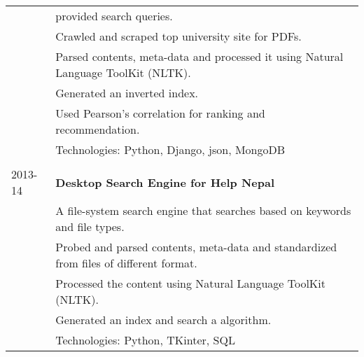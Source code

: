 \documentclass[letterpaper,10pt,oneside]{article}
\newcommand{\nextitem}{\par\hspace*{\labelsep}\textbullet\hspace*{\labelsep}}
\begin{document}
\begin{tabular}{l l}
         & provided search queries. \\
         & \footnotesize{\nextitem Crawled and scraped top university site for PDFs.} \\
         & \footnotesize{\nextitem Parsed contents, meta-data and processed it using Natural Language ToolKit (NLTK).} \\
         & \footnotesize{\nextitem Generated an inverted index.} \\
         & \footnotesize{\nextitem Used Pearson's correlation for ranking and recommendation.} \\
         & Technologies: Python, Django, json, MongoDB \\
         \\
 2013-14 & \textbf{Desktop Search Engine for Help Nepal} \\
         & A file-system search engine that searches based on keywords and file types. \\
         & \footnotesize{\nextitem Probed and parsed contents, meta-data and standardized from files of different format.} \\
         & \footnotesize{\nextitem Processed the content using Natural Language ToolKit (NLTK).} \\
         & \footnotesize{\nextitem Generated an index and search a algorithm.} \\
         & Technologies: Python, TKinter, SQL \\
\end{tabular}
\end{document}
